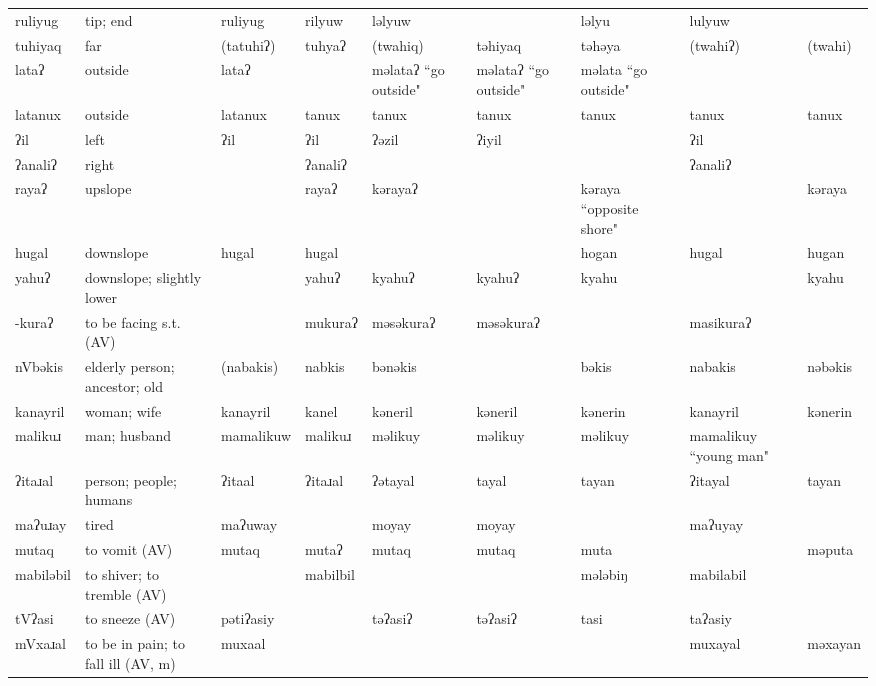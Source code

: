 \begin{landscape}
\begin{longtable}{*{9}{>{\raggedright\arraybackslash}p{}}}
\text{*}ruliyug & tip; end & ruliyug & rilyuw & ləlyuw &  & ləlyu & lulyuw & \\
\text{*}tuhiyaq & far & (tatuhiʔ) & tuhyaʔ & (twahiq) & təhiyaq & təhəya & (twahiʔ) & (twahi)\\
\text{*}lataʔ & outside & lataʔ &  & məlataʔ \newline ``go outside" & məlataʔ \newline ``go outside" & məlata \newline ``go outside" &  & \\
\text{*}latanux & outside & latanux & tanux & tanux & tanux & tanux & tanux & tanux\\
\text{*}ʔil & left & ʔil & ʔil & ʔəzil & ʔiyil &  & ʔil & \\
\text{*}ʔanaliʔ & right &  & ʔanaliʔ &  &  &  & ʔanaliʔ & \\
\text{*}rayaʔ & upslope &  & rayaʔ & kərayaʔ &  & kəraya ``opposite shore" &  & kəraya\\
\text{*}hugal & downslope & hugal & hugal &  &  & hogan & hugal & hugan\\
\text{*}yahuʔ & downslope; slightly lower &  & yahuʔ & kyahuʔ & kyahuʔ & kyahu &  & kyahu\\
\text{*}-kuraʔ & to be facing s.t. (AV) &  & mukuraʔ & məsəkuraʔ & məsəkuraʔ &  & masikuraʔ & \\
\text{*}nVbəkis & elderly person; ancestor; old & (nabakis) & nabkis & bənəkis &  & bəkis & nabakis & nəbəkis\\
\text{*}kanayril & woman; wife & kanayril & kanel & kəneril & kəneril & kənerin & kanayril & kənerin\\
\text{*}malikuɹ & man; husband & mamalikuw & malikuɹ & məlikuy & məlikuy & məlikuy & mamalikuy ``young man" & \\
\text{*}ʔitaɹal & person; people; humans & ʔitaal & ʔitaɹal & ʔətayal & tayal & tayan & ʔitayal & tayan\\
\text{*}maʔuɹay & tired & maʔuway &  & moyay & moyay &  & maʔuyay & \\
\text{*}mutaq & to vomit (AV) & mutaq & mutaʔ & mutaq & mutaq & muta &  & məputa\\
\text{*}mabiləbil & to shiver; to tremble (AV) &  & mabilbil &  &  & mələbiŋ & mabilabil & \\
\text{*}tVʔasi & to sneeze (AV) & pətiʔasiy &  & təʔasiʔ & təʔasiʔ & tasi & taʔasiy & \\
\text{*}mVxaɹal & to be in pain; to fall ill (AV, m) & muxaal &  &  &  &  & muxayal & məxayan\\

\end{longtable}
\end{landscape}
